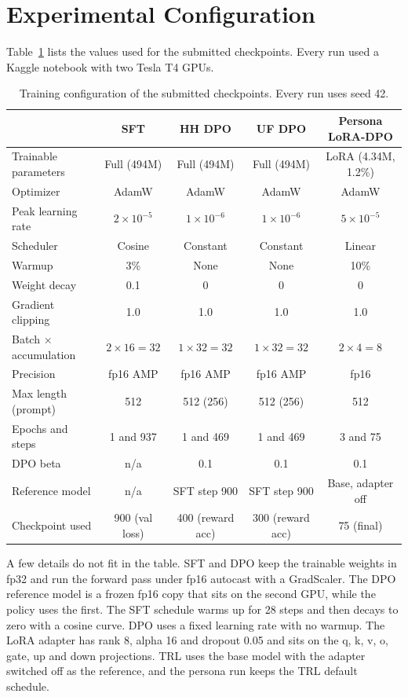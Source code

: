\documentclass[11pt]{article}
\begin{document}
\section{Experimental Configuration}

Table~\ref{tab:config} lists the values used for the submitted checkpoints.
Every run used a Kaggle notebook with two Tesla T4 GPUs.

\begin{table}[htbp]
\centering\small
\begin{tabular}{l c c c c}
\toprule
 & SFT & HH DPO & UF DPO & Persona LoRA-DPO \\
\midrule
Trainable parameters & Full (494M) & Full (494M) & Full (494M) & LoRA (4.34M, 1.2\%) \\
Optimizer & AdamW & AdamW & AdamW & AdamW \\
Peak learning rate & $2\times10^{-5}$ & $1\times10^{-6}$ & $1\times10^{-6}$ & $5\times10^{-5}$ \\
Scheduler & Cosine & Constant & Constant & Linear \\
Warmup & 3\% & None & None & 10\% \\
Weight decay & 0.1 & 0 & 0 & 0 \\
Gradient clipping & 1.0 & 1.0 & 1.0 & 1.0 \\
Batch $\times$ accumulation & $2\times16=32$ & $1\times32=32$ & $1\times32=32$ & $2\times4=8$ \\
Precision & fp16 AMP & fp16 AMP & fp16 AMP & fp16 \\
Max length (prompt) & 512 & 512 (256) & 512 (256) & 512 \\
Epochs and steps & 1 and 937 & 1 and 469 & 1 and 469 & 3 and 75 \\
DPO beta & n/a & 0.1 & 0.1 & 0.1 \\
Reference model & n/a & SFT step 900 & SFT step 900 & Base, adapter off \\
Checkpoint used & 900 (val loss) & 400 (reward acc) & 300 (reward acc) & 75 (final) \\
\bottomrule
\end{tabular}
\caption{Training configuration of the submitted checkpoints. Every run uses seed 42.}
\label{tab:config}
\end{table}

A few details do not fit in the table.
SFT and DPO keep the trainable weights in fp32 and run the forward pass under fp16 autocast with a GradScaler.
The DPO reference model is a frozen fp16 copy that sits on the second GPU, while the policy uses the first.
The SFT schedule warms up for 28 steps and then decays to zero with a cosine curve.
DPO uses a fixed learning rate with no warmup.
The LoRA adapter has rank 8, alpha 16 and dropout 0.05 and sits on the q, k, v, o, gate, up and down projections.
TRL uses the base model with the adapter switched off as the reference, and the persona run keeps the TRL default schedule.
\end{document}
